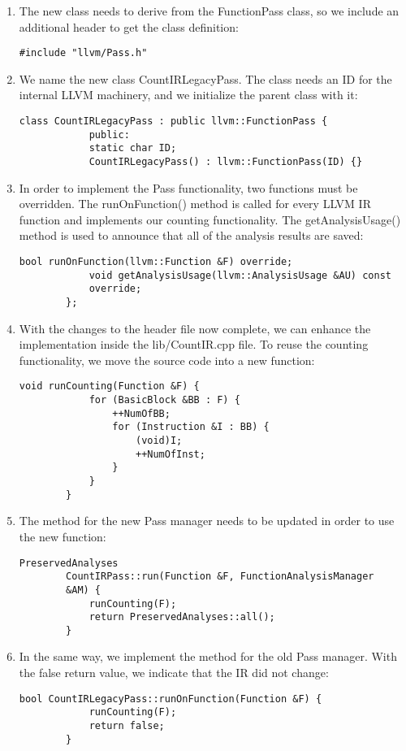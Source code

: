 \begin{enumerate}
	\item The new class needs to derive from the FunctionPass class, so we include an additional header to get the class definition:
	\begin{lstlisting}[caption={}]
		#include "llvm/Pass.h"
	\end{lstlisting}
	
	\item We name the new class CountIRLegacyPass. The class needs an ID for the internal LLVM machinery, and we initialize the parent class with it:
	\begin{lstlisting}[caption={}]
		class CountIRLegacyPass : public llvm::FunctionPass {
			public:
			static char ID;
			CountIRLegacyPass() : llvm::FunctionPass(ID) {}
		\end{lstlisting}
		
		\item In order to implement the Pass functionality, two functions must be overridden. The runOnFunction() method is called for every LLVM IR function and implements our counting functionality. The getAnalysisUsage() method is used to announce that all of the analysis results are saved:
		\begin{lstlisting}[caption={}]
			bool runOnFunction(llvm::Function &F) override;
			void getAnalysisUsage(llvm::AnalysisUsage &AU) const 
			override;
		};
	\end{lstlisting}
	
	\item With the changes to the header file now complete, we can enhance the implementation inside the lib/CountIR.cpp file. To reuse the counting functionality, we move the source code into a new function:
	\begin{lstlisting}[caption={}]
		void runCounting(Function &F) {
			for (BasicBlock &BB : F) {
				++NumOfBB;
				for (Instruction &I : BB) {
					(void)I;
					++NumOfInst;
				}
			}
		}
	\end{lstlisting}
	
	\item The method for the new Pass manager needs to be updated in order to use the 
	new function:
	\begin{lstlisting}[caption={}]
		PreservedAnalyses
		CountIRPass::run(Function &F, FunctionAnalysisManager 
		&AM) {
			runCounting(F);
			return PreservedAnalyses::all();
		}
	\end{lstlisting}
	
	\item In the same way, we implement the method for the old Pass manager. With the false return value, we indicate that the IR did not change:
	\begin{lstlisting}[caption={}]
		bool CountIRLegacyPass::runOnFunction(Function &F) {
			runCounting(F);
			return false;
		}
	\end{lstlisting}
	

\end{enumerate}
